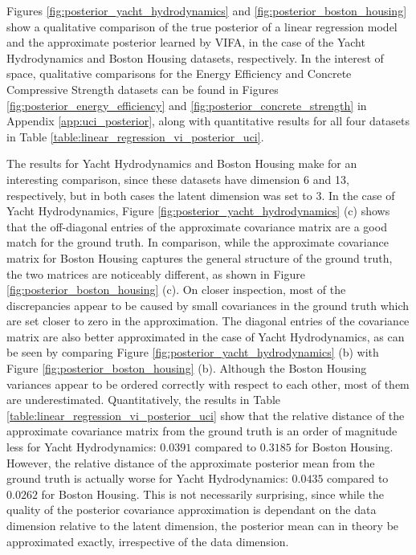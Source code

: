 \documentclass[msc,deptreport.inf]{infthesis} %
\begin{document}
Figures \ref{fig:posterior_yacht_hydrodynamics} and \ref{fig:posterior_boston_housing} show a qualitative comparison of the true posterior of a linear regression model and the approximate posterior learned by VIFA, in the case of the Yacht Hydrodynamics and Boston Housing datasets, respectively. In the interest of space, qualitative comparisons for the Energy Efficiency and Concrete Compressive Strength datasets can be found in Figures \ref{fig:posterior_energy_efficiency} and \ref{fig:posterior_concrete_strength} in Appendix \ref{app:uci_posterior}, along with quantitative results for all four datasets in Table \ref{table:linear_regression_vi_posterior_uci}.

The results for Yacht Hydrodynamics and Boston Housing make for an interesting comparison, since these datasets have dimension 6 and 13, respectively, but in both cases the latent dimension was set to 3. In the case of Yacht Hydrodynamics, Figure \ref{fig:posterior_yacht_hydrodynamics} (c) shows that the off-diagonal entries of the approximate covariance matrix are a good match for  the ground truth. In comparison, while the approximate covariance matrix for Boston Housing captures the general structure of the ground truth, the two matrices are noticeably different, as shown in Figure \ref{fig:posterior_boston_housing} (c). On closer inspection, most of the discrepancies appear to be caused by small covariances in the ground truth which are set closer to zero in the approximation. The diagonal entries of the covariance matrix are also better approximated in the case of Yacht Hydrodynamics, as can be seen by comparing Figure \ref{fig:posterior_yacht_hydrodynamics} (b) with Figure \ref{fig:posterior_boston_housing} (b). Although the Boston Housing variances appear to be ordered correctly with respect to each other, most of them are underestimated. Quantitatively, the results in Table \ref{table:linear_regression_vi_posterior_uci} show that the relative distance of the approximate covariance matrix from the ground truth is an order of magnitude less for Yacht Hydrodynamics: $0.0391$ compared to $0.3185$ for Boston Housing. However, the relative distance of the approximate posterior mean from the ground truth is actually worse for Yacht Hydrodynamics: $0.0435$ compared to $0.0262$ for Boston Housing. This is not necessarily surprising, since while the quality of the posterior covariance approximation is dependant on the data dimension relative to the latent dimension, the posterior mean can in theory be approximated exactly, irrespective of the data dimension. 
\end{document}
